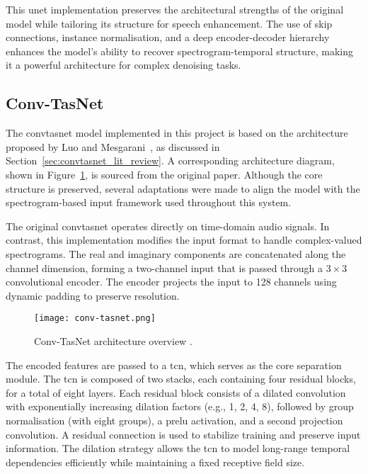 This \gls{unet} implementation preserves the architectural strengths of the original model while tailoring its structure for speech enhancement. The use of skip connections, instance normalisation, and a deep encoder-decoder hierarchy enhances the model’s ability to recover spectrogram-temporal structure, making it a powerful architecture for complex denoising tasks.

\subsection{Conv-TasNet}
\label{sec:convtasnet}

The \gls{convtasnet} model implemented in this project is based on the architecture proposed by Luo and Mesgarani~\cite{Luo2018ConvTasNetSI}, as discussed in Section~\ref{sec:convtasnet_lit_review}. A corresponding architecture diagram, shown in Figure~\ref{fig:convtasnet}, is sourced from the original paper. Although the core structure is preserved, several adaptations were made to align the model with the spectrogram-based input framework used throughout this system.

The original \gls{convtasnet} operates directly on time-domain audio signals. In contrast, this implementation modifies the input format to handle complex-valued spectrograms. The real and imaginary components are concatenated along the channel dimension, forming a two-channel input that is passed through a \(3 \times 3\) convolutional encoder. The encoder projects the input to 128 channels using dynamic padding to preserve resolution.

\begin{figure}[h]
    \centering
    \texttt{[image: conv-tasnet.png]}
    \caption{\label{fig:convtasnet}Conv-TasNet architecture overview \cite{Luo2018ConvTasNetSI}.}
\end{figure}

The encoded features are passed to a \gls{tcn}, which serves as the core separation module. The \gls{tcn} is composed of two stacks, each containing four residual blocks, for a total of eight layers. Each residual block consists of a dilated convolution with exponentially increasing dilation factors (e.g., 1, 2, 4, 8), followed by group normalisation (with eight groups), a \gls{prelu} activation, and a second projection convolution. A residual connection is used to stabilize training and preserve input information. The dilation strategy allows the \gls{tcn} to model long-range temporal dependencies efficiently while maintaining a fixed receptive field size.


